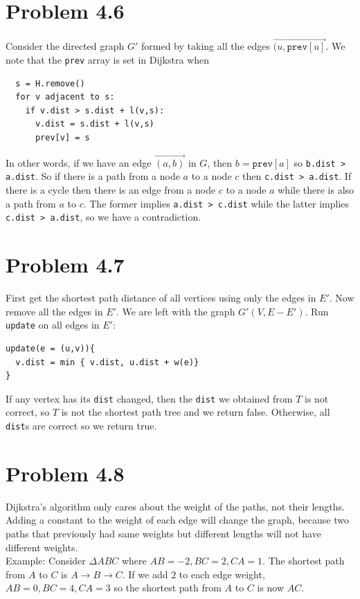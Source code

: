 \documentclass[12pt]{report}
\newcommand{\co}{\texttt}
\begin{document}
\section{Problem 4.6}
Consider the directed graph $G'$ formed by taking all the edges $\overrightarrow{(u, \co{prev}[u]}$. We note that the \co{prev} array is set in Dijkstra when
\begin{lstlisting}
  s = H.remove()
  for v adjacent to s:
    if v.dist > s.dist + l(v,s):
      v.dist = s.dist + l(v,s)
      prev[v] = s
\end{lstlisting}
In other words, if we have an edge $\overrightarrow{(a,b)}$ in $G$, then $b = \co{prev}[a]$ so \co{b.dist > a.dist}. So if there is a path from a node $a$ to a node $c$ then \co{c.dist > a.dist}. If there is a cycle then there is an edge from a node $c$ to a node $a$ while there is also a path from $a$ to $c$. The former implies \co{a.dist > c.dist} while the latter implies \co{c.dist > a.dist}, so we have a contradiction.

\section{Problem 4.7}
First get the shortest path distance of all vertices using only the edges in $E'$. Now remove all the edges in $E'$. We are left with the graph $G'(V, E - E')$. Run \co{update} on all edges in $E'$:
\begin{lstlisting}
update(e = (u,v)){
  v.dist = min { v.dist, u.dist + w(e)}
}
\end{lstlisting}
If any vertex has its \co{dist} changed, then the \co{dist} we obtained from $T$ is not correct, so $T$ is not the shortest path tree and we return false. Otherwise, all \co{dist}s are correct so we return true.

\section{Problem 4.8}
Dijkstra's algorithm only cares about the weight of the paths, not their lengths. Adding a constant to the weight of each edge will change the graph, because two paths that previously had same weights but different lengths will not have different weights. \\
Example: Consider $\Delta ABC$ where $AB = -2, BC = 2, CA = 1$. The shortest path from $A$ to $C$ is $A \to B \to C$. If we add $2$ to each edge weight, $AB = 0, BC = 4, CA = 3$ so the shortest path from $A$ to $C$ is now $AC$.
\end{document}
